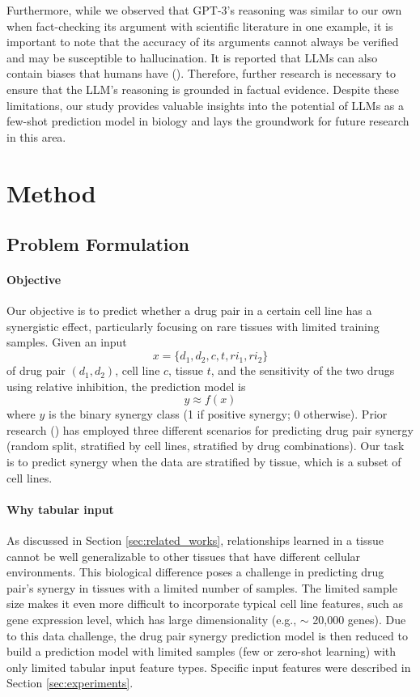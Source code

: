 Furthermore, while we observed that GPT-3's reasoning was similar to our own when fact-checking its argument with scientific literature in one example, it is important to note that the accuracy of its arguments cannot always be verified and may be susceptible to hallucination. It is reported that LLMs can also contain biases that humans have (\cite{Schramowski2022-yg}). Therefore, further research is necessary to ensure that the LLM's reasoning is grounded in factual evidence. Despite these limitations, our study provides valuable insights into the potential of LLMs as a few-shot prediction model in biology and lays the groundwork for future research in this area.

\section{Method}

\subsection{Problem Formulation}

\paragraph{Objective}
Our objective is to predict whether a drug pair in a certain cell line has a synergistic effect, particularly focusing on rare tissues with limited training samples. Given an input $$x = \{d_1, d_2, c, t, ri_1, ri_2 \}$$ of drug pair $(d_1, d_2)$, cell line $c$, tissue $t$, and the sensitivity of the two drugs using relative inhibition, the prediction model is $$y \approx f(x) $$ where $y$ is the binary synergy class (1 if positive synergy; 0 otherwise).  Prior research (\cite{10.1093/bioinformatics/btac579, hosseini_ccsynergy_2023}) has employed three different scenarios for predicting drug pair synergy (random split, stratified by cell lines, stratified by drug combinations). Our task is to predict synergy when the data are stratified by tissue, which is a subset of cell lines.

\paragraph{Why tabular input}
As discussed in Section \ref{sec:related_works}, relationships learned in a tissue cannot be well generalizable to other tissues that have different cellular environments. This biological difference poses a challenge in predicting drug pair’s synergy in tissues with a limited number of samples. The limited sample size makes it even more difficult to incorporate typical cell line features, such as gene expression level, which has large dimensionality (e.g., $\sim$ 20,000 genes). Due to this data challenge, the drug pair synergy prediction model is then reduced to build a prediction model with limited samples (few or zero-shot learning) with only limited tabular input feature types. Specific input features were described in Section \ref{sec:experiments}.

